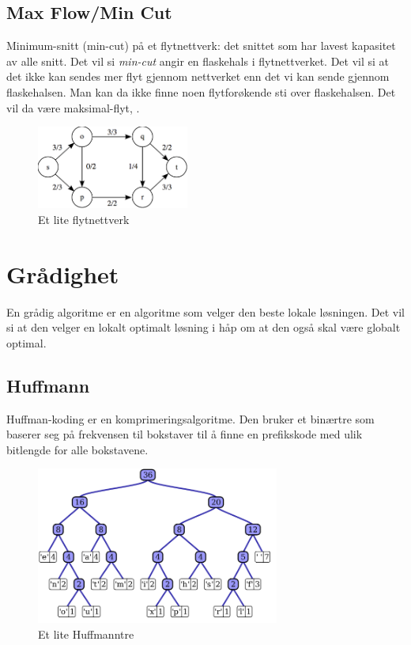 \documentclass[a4paper, norsk,  10pt]{article}
\begin{document}
{{\begin{algorithmic}
\subsection{Max Flow/Min Cut}

Minimum-snitt (min-cut) på et flytnettverk: det snittet som har lavest kapasitet av alle snitt. Det vil si \textit{min-cut} angir en flaskehals i flytnettverket. Det vil si at det ikke kan sendes mer flyt gjennom nettverket enn det vi kan sende gjennom flaskehalsen. Man kan da ikke finne noen flytforøkende sti over flaskehalsen. Det vil da være maksimal-flyt, .

\begin{figure}[hbt]
    \begin{center}
        \includegraphics[width=5cm] {flow.png}
        \caption{Et lite flytnettverk}
    \end{center}
\end{figure}

\section{Grådighet}

En grådig algoritme er en algoritme som velger den beste lokale løsningen. Det vil si at den velger en lokalt optimalt løsning i håp om at den også skal være globalt optimal. 

\subsection{Huffmann}

Huffman-koding er en komprimeringsalgoritme. Den bruker et binærtre som baserer seg på frekvensen til bokstaver til å finne en prefikskode med ulik bitlengde for alle bokstavene. 

\begin{center}
\begin{figure}[hbt]
    \begin{center}
        \includegraphics[width=8cm] {huff.png}
        \caption{Et lite Huffmanntre}
    \end{center}
\end{figure}
\end{center}


\end{algorithmic}}}
\end{document}
